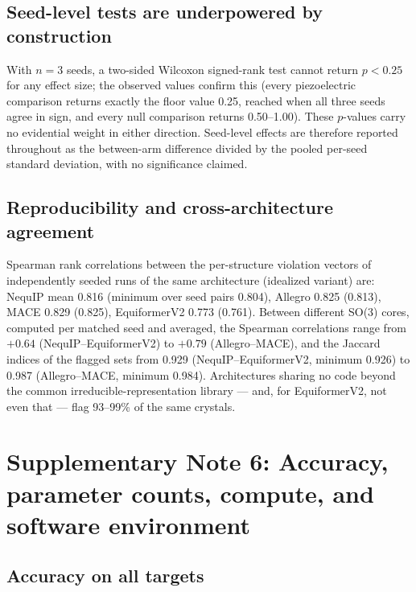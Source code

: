 \subsection*{Seed-level tests are underpowered by construction}

With $n = 3$ seeds, a two-sided Wilcoxon signed-rank test cannot return $p < 0.25$ for any effect size; the observed values confirm this (every piezoelectric comparison returns exactly the floor value 0.25, reached when all three seeds agree in sign, and every null comparison returns 0.50--1.00). These $p$-values carry no evidential weight in either direction. Seed-level effects are therefore reported throughout as the between-arm difference divided by the pooled per-seed standard deviation, with no significance claimed.

\subsection*{Reproducibility and cross-architecture agreement}

Spearman rank correlations between the per-structure violation vectors of independently seeded runs of the same architecture (idealized variant) are: NequIP mean 0.816 (minimum over seed pairs 0.804), Allegro 0.825 (0.813), MACE 0.829 (0.825), EquiformerV2 0.773 (0.761). Between different SO(3) cores, computed per matched seed and averaged, the Spearman correlations range from $+0.64$ (NequIP--EquiformerV2) to $+0.79$ (Allegro--MACE), and the Jaccard indices of the flagged sets from 0.929 (NequIP--EquiformerV2, minimum 0.926) to 0.987 (Allegro--MACE, minimum 0.984). Architectures sharing no code beyond the common irreducible-representation library --- and, for EquiformerV2, not even that --- flag 93--99\% of the same crystals.

\section*{Supplementary Note 6: Accuracy, parameter counts, compute, and software environment}

\subsection*{Accuracy on all targets}

